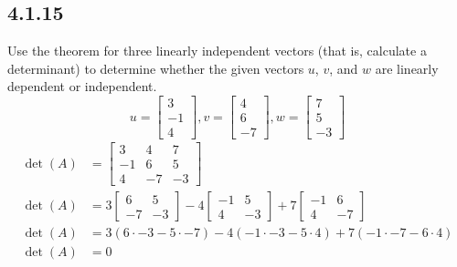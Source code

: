 \documentclass{article}
\begin{document}
\subsection{4.1.15}
Use the theorem for three linearly independent vectors (that is, calculate a determinant) to determine whether the given vectors $ u $, $ v $, and $ w $ are linearly dependent or independent.
$$
	u = \begin{bmatrix} 3 \\ -1 \\ 4 \end{bmatrix},
	v = \begin{bmatrix} 4 \\ 6 \\ -7 \end{bmatrix},
	w = \begin{bmatrix} 7 \\ 5 \\ -3 \end{bmatrix}
$$
\begin{align*}
	\det(A) & = \begin{bmatrix}
		3 & 4 & 7 \\
		-1 & 6 & 5 \\
		4 & -7 & -3
	\end{bmatrix} \\
	\det(A) & =
		3 \begin{bmatrix} 6 & 5 \\ -7 & -3 \end{bmatrix}
		- 4 \begin{bmatrix} -1 & 5 \\ 4 & -3 \end{bmatrix}
		+ 7 \begin{bmatrix} -1 & 6 \\ 4 & -7 \end{bmatrix} \\
	\det(A) & = 3(6 \cdot -3 - 5 \cdot -7) - 4(-1 \cdot -3 - 5 \cdot 4) + 7(-1 \cdot -7 - 6 \cdot 4) \\
	\det(A) & = 0
\end{align*}
\end{document}
